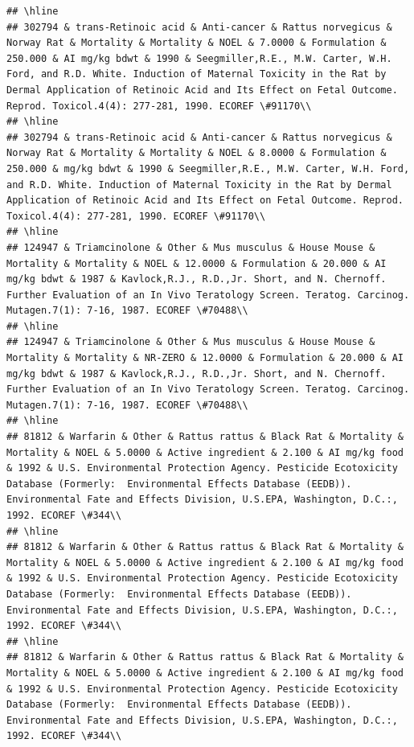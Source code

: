 \documentclass[12pt,]{article}
\begin{document}
\begin{verbatim}
## \hline
## 302794 & trans-Retinoic acid & Anti-cancer & Rattus norvegicus & Norway Rat & Mortality & Mortality & NOEL & 7.0000 & Formulation & 250.000 & AI mg/kg bdwt & 1990 & Seegmiller,R.E., M.W. Carter, W.H. Ford, and R.D. White. Induction of Maternal Toxicity in the Rat by Dermal Application of Retinoic Acid and Its Effect on Fetal Outcome. Reprod. Toxicol.4(4): 277-281, 1990. ECOREF \#91170\\
## \hline
## 302794 & trans-Retinoic acid & Anti-cancer & Rattus norvegicus & Norway Rat & Mortality & Mortality & NOEL & 8.0000 & Formulation & 250.000 & mg/kg bdwt & 1990 & Seegmiller,R.E., M.W. Carter, W.H. Ford, and R.D. White. Induction of Maternal Toxicity in the Rat by Dermal Application of Retinoic Acid and Its Effect on Fetal Outcome. Reprod. Toxicol.4(4): 277-281, 1990. ECOREF \#91170\\
## \hline
## 124947 & Triamcinolone & Other & Mus musculus & House Mouse & Mortality & Mortality & NOEL & 12.0000 & Formulation & 20.000 & AI mg/kg bdwt & 1987 & Kavlock,R.J., R.D.,Jr. Short, and N. Chernoff. Further Evaluation of an In Vivo Teratology Screen. Teratog. Carcinog. Mutagen.7(1): 7-16, 1987. ECOREF \#70488\\
## \hline
## 124947 & Triamcinolone & Other & Mus musculus & House Mouse & Mortality & Mortality & NR-ZERO & 12.0000 & Formulation & 20.000 & AI mg/kg bdwt & 1987 & Kavlock,R.J., R.D.,Jr. Short, and N. Chernoff. Further Evaluation of an In Vivo Teratology Screen. Teratog. Carcinog. Mutagen.7(1): 7-16, 1987. ECOREF \#70488\\
## \hline
## 81812 & Warfarin & Other & Rattus rattus & Black Rat & Mortality & Mortality & NOEL & 5.0000 & Active ingredient & 2.100 & AI mg/kg food & 1992 & U.S. Environmental Protection Agency. Pesticide Ecotoxicity Database (Formerly:  Environmental Effects Database (EEDB)). Environmental Fate and Effects Division, U.S.EPA, Washington, D.C.:, 1992. ECOREF \#344\\
## \hline
## 81812 & Warfarin & Other & Rattus rattus & Black Rat & Mortality & Mortality & NOEL & 5.0000 & Active ingredient & 2.100 & AI mg/kg food & 1992 & U.S. Environmental Protection Agency. Pesticide Ecotoxicity Database (Formerly:  Environmental Effects Database (EEDB)). Environmental Fate and Effects Division, U.S.EPA, Washington, D.C.:, 1992. ECOREF \#344\\
## \hline
## 81812 & Warfarin & Other & Rattus rattus & Black Rat & Mortality & Mortality & NOEL & 5.0000 & Active ingredient & 2.100 & AI mg/kg food & 1992 & U.S. Environmental Protection Agency. Pesticide Ecotoxicity Database (Formerly:  Environmental Effects Database (EEDB)). Environmental Fate and Effects Division, U.S.EPA, Washington, D.C.:, 1992. ECOREF \#344\\

\end{verbatim}
\end{document}
